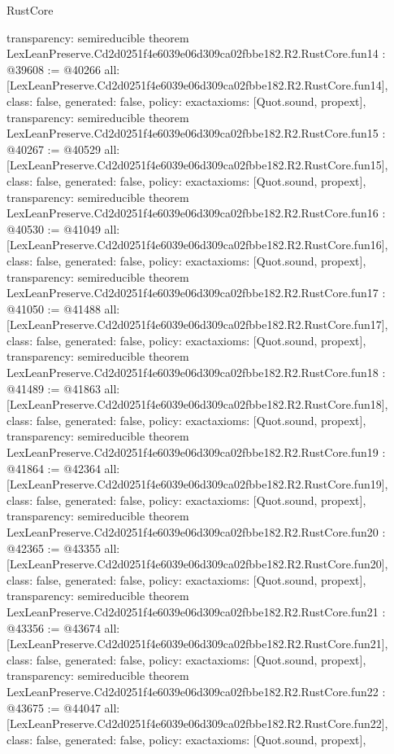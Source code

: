 \begin{lexlean}{RustCore}
\begin{coremodule}
{  transparency: semireducible
}
theorem LexLeanPreserve.Cd2d0251f4e6039e06d309ca02fbbe182.R2.RustCore.fun14 : @39608 := @40266 {
  all: [LexLeanPreserve.Cd2d0251f4e6039e06d309ca02fbbe182.R2.RustCore.fun14],
  class: false,
  generated: false,
  policy: exact{axioms: [Quot.sound, propext]},
  transparency: semireducible
}
theorem LexLeanPreserve.Cd2d0251f4e6039e06d309ca02fbbe182.R2.RustCore.fun15 : @40267 := @40529 {
  all: [LexLeanPreserve.Cd2d0251f4e6039e06d309ca02fbbe182.R2.RustCore.fun15],
  class: false,
  generated: false,
  policy: exact{axioms: [Quot.sound, propext]},
  transparency: semireducible
}
theorem LexLeanPreserve.Cd2d0251f4e6039e06d309ca02fbbe182.R2.RustCore.fun16 : @40530 := @41049 {
  all: [LexLeanPreserve.Cd2d0251f4e6039e06d309ca02fbbe182.R2.RustCore.fun16],
  class: false,
  generated: false,
  policy: exact{axioms: [Quot.sound, propext]},
  transparency: semireducible
}
theorem LexLeanPreserve.Cd2d0251f4e6039e06d309ca02fbbe182.R2.RustCore.fun17 : @41050 := @41488 {
  all: [LexLeanPreserve.Cd2d0251f4e6039e06d309ca02fbbe182.R2.RustCore.fun17],
  class: false,
  generated: false,
  policy: exact{axioms: [Quot.sound, propext]},
  transparency: semireducible
}
theorem LexLeanPreserve.Cd2d0251f4e6039e06d309ca02fbbe182.R2.RustCore.fun18 : @41489 := @41863 {
  all: [LexLeanPreserve.Cd2d0251f4e6039e06d309ca02fbbe182.R2.RustCore.fun18],
  class: false,
  generated: false,
  policy: exact{axioms: [Quot.sound, propext]},
  transparency: semireducible
}
theorem LexLeanPreserve.Cd2d0251f4e6039e06d309ca02fbbe182.R2.RustCore.fun19 : @41864 := @42364 {
  all: [LexLeanPreserve.Cd2d0251f4e6039e06d309ca02fbbe182.R2.RustCore.fun19],
  class: false,
  generated: false,
  policy: exact{axioms: [Quot.sound, propext]},
  transparency: semireducible
}
theorem LexLeanPreserve.Cd2d0251f4e6039e06d309ca02fbbe182.R2.RustCore.fun20 : @42365 := @43355 {
  all: [LexLeanPreserve.Cd2d0251f4e6039e06d309ca02fbbe182.R2.RustCore.fun20],
  class: false,
  generated: false,
  policy: exact{axioms: [Quot.sound, propext]},
  transparency: semireducible
}
theorem LexLeanPreserve.Cd2d0251f4e6039e06d309ca02fbbe182.R2.RustCore.fun21 : @43356 := @43674 {
  all: [LexLeanPreserve.Cd2d0251f4e6039e06d309ca02fbbe182.R2.RustCore.fun21],
  class: false,
  generated: false,
  policy: exact{axioms: [Quot.sound, propext]},
  transparency: semireducible
}
theorem LexLeanPreserve.Cd2d0251f4e6039e06d309ca02fbbe182.R2.RustCore.fun22 : @43675 := @44047 {
  all: [LexLeanPreserve.Cd2d0251f4e6039e06d309ca02fbbe182.R2.RustCore.fun22],
  class: false,
  generated: false,
  policy: exact{axioms: [Quot.sound, propext]},
}
\end{coremodule}
\end{lexlean}
